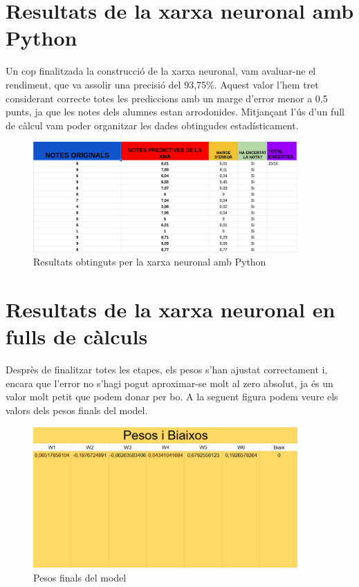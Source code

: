 \section{Resultats de la xarxa neuronal amb Python}

Un cop finalitzada la construcció de la xarxa neuronal, vam avaluar-ne el rendiment, que va assolir una precisió del 93,75\%. Aquest valor l'hem tret considerant correcte totes les prediccions amb un marge d'error menor a 0,5 punts, ja que les notes dels alumnes estan arrodonides. Mitjançant l’ús d’un full de càlcul vam poder organitzar les dades obtingudes estadísticament.

\begin{figure}[h!]
 \centering
 \includegraphics[width=0.9\textwidth]{./figures/Resultats.png}
 \caption{Resultats obtinguts per la xarxa neuronal amb Python}
 \label{f:resultats}
\end{figure}


\section{Resultats de la xarxa neuronal en fulls de càlculs}\label{sec: full de càlcul}
Desprès de finalitzar totes les etapes, els pesos s'han ajustat correctament i, encara que l'error no s'hagi pogut aproximar-se molt al zero absolut, ja és un valor molt petit que podem donar per bo. A la seguent figura podem veure els valors dels pesos finals del model.

\begin{figure}[H]
    \centering
    \includegraphics[width=0.9\textwidth]{./figures/Pesos_finals.png}
    \caption{Pesos finals del model}
\end{figure}


